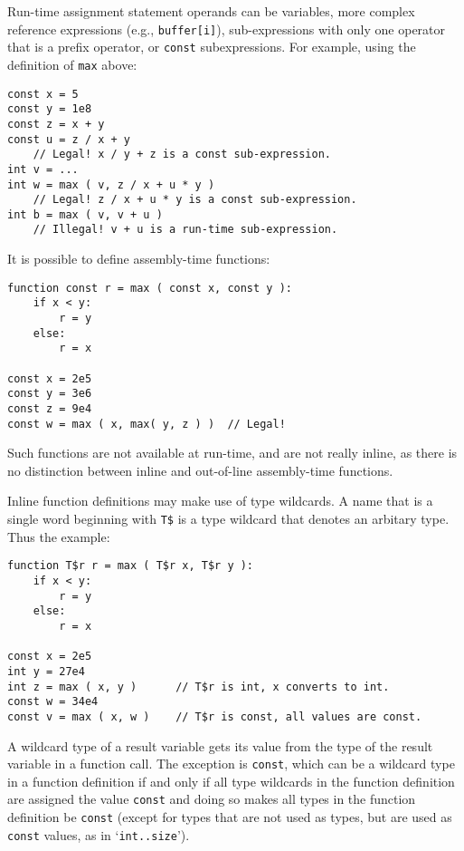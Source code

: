 \documentclass[12pt]{article}
\newenvironment{indpar}[1][0.3in]%
	{\begin{list}{}%
		     {\setlength{\itemsep}{0in}%
		      \setlength{\topsep}{0in}%
		      \setlength{\parsep}{1ex}%
		      \setlength{\labelwidth}{#1}%
		      \setlength{\leftmargin}{#1}%
		      \addtolength{\leftmargin}{\labelsep}}%
	 \item}%
	{\end{list}}
\begin{document}
Run-time assignment statement operands can be variables, more
complex reference expressions (e.g., {\tt buffer[i]}),
sub-expressions with only one operator that is a prefix operator,
or {\tt const} subexpressions.
For example, using the definition of {\tt max} above:

\begin{indpar}\begin{verbatim}
const x = 5
const y = 1e8
const z = x + y
const u = z / x + y
    // Legal! x / y + z is a const sub-expression.
int v = ...
int w = max ( v, z / x + u * y )
    // Legal! z / x + u * y is a const sub-expression.
int b = max ( v, v + u ) 
    // Illegal! v + u is a run-time sub-expression.
\end{verbatim}\end{indpar}

It is possible to define assembly-time functions:

\begin{indpar}\begin{verbatim}
function const r = max ( const x, const y ):
    if x < y:
        r = y
    else:
        r = x

const x = 2e5
const y = 3e6
const z = 9e4
const w = max ( x, max( y, z ) )  // Legal!
\end{verbatim}\end{indpar}

Such functions are not available at run-time, and
are not really inline, as there is no
distinction between inline and out-of-line assembly-time functions.

Inline function definitions may make use of type wildcards.
A name that is a single word beginning with {\tt T\$}
is a type wildcard that denotes
an arbitary type.  Thus the example:

\begin{indpar}\begin{verbatim}
function T$r r = max ( T$r x, T$r y ):
    if x < y:
        r = y
    else:
        r = x

const x = 2e5
int y = 27e4
int z = max ( x, y )      // T$r is int, x converts to int.
const w = 34e4
const v = max ( x, w )    // T$r is const, all values are const.
\end{verbatim}\end{indpar}

A wildcard type of a result variable gets its value from the
type of the result variable in a function call.  The exception
is {\tt const}, which can be a wildcard type in a function
definition if and only if all type wildcards in the function definition
are assigned the value {\tt const} and doing so makes
all types in the function definition be {\tt const}
(except for types that are not used as types, but are used as
{\tt const} values, as in `{\tt int..size}').
\end{document}
